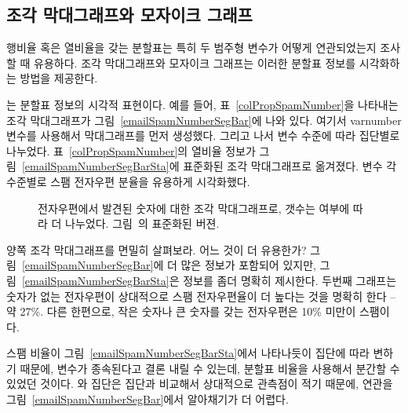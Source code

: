 \textC{\newpage}

\subsection{조각 막대그래프와 모자이크 그래프}
\label{segmentedBarPlotsAndIndependence}

행비율 혹은 열비율을 갖는 분할표는 특히 두 범주형 변수가 어떻게 연관되었는지 조사할 때 유용하다. 조각 막대그래프와 모자이크 그래프는 이러한 분할표 정보를 시각화하는 방법을 제공한다.

는 분할표 정보의 시각적 표현이다. 예를 들어, 표~\ref{colPropSpamNumber}을 나타내는 조각 막대그래프가 그림~\ref{emailSpamNumberSegBar}에 나와 있다. 여기서 var{number} 변수를 사용해서 막대그래프를 먼저 생성했다. 그리고 나서  변수 수준에 따라 집단별로 나누었다. 표~\ref{colPropSpamNumber}의 열비율 정보가 그림~\ref{emailSpamNumberSegBarSta}에 표준화된 조각 막대그래프로 옮겨졌다.  변수 각 수준별로 스팸 전자우편 분율을 유용하게 시각화했다.

\begin{figure}[h]
\centering
{}
\caption{ 
전자우편에서 발견된 숫자에 대한 조각 막대그래프로, 갯수는  여부에 따라 더 나누었다.  그림~의 표준화된 버젼.}
\label{emailSpamNumberSegBarPlot}
\end{figure}

\begin{example}{양쪽 조각 막대그래프를 면밀히 살펴보라. 어느 것이 더 유용한가?}
그림~\ref{emailSpamNumberSegBar}에 더 많은 정보가 포함되어 있지만, 그림~\ref{emailSpamNumberSegBarSta}은 정보를 좀더 명확히 제시한다. 두번째 그래프는 숫자가 없는 전자우편이 상대적으로 스팸 전자우편율이 더 높다는 것을 명확히 한다 -- 약 27\%. 다른 한편으로, 작은 숫자나 큰 숫자를 갖는 전자우편은 10\% 미만이 스팸이다.
\end{example}

스팸 비율이 그림~\ref{emailSpamNumberSegBarSta}에서 나타나듯이 집단에 따라 변하기 때문에, 변수가 종속된다고 결론 내릴 수 있는데, 분할표 비율을 사용해서 분간할 수 있었던 것이다.   와  집단은  집단과 비교해서 상대적으로 관측점이 적기 때문에, 연관을 그림~\ref{emailSpamNumberSegBar}에서 알아채기가 더 어렵다.

